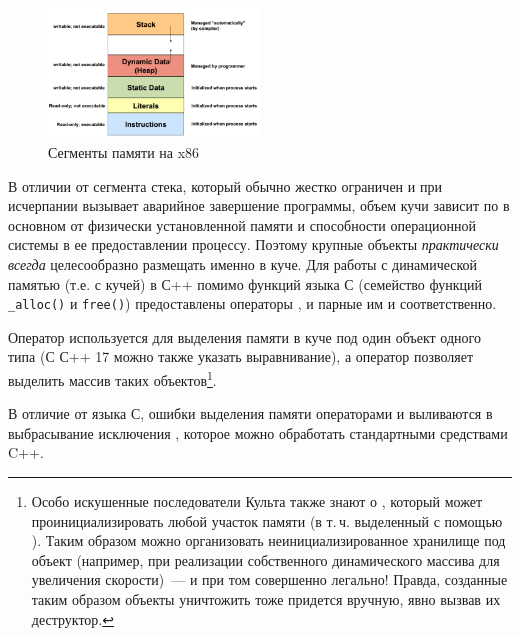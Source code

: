 \begin{figure}[h]
    \centering
    \includegraphics[width=0.5\textwidth]{resources/8-14/mem.png}
    \caption{Сегменты памяти на x86}
    \label{fig:memory_segments}
\end{figure}

В отличии от сегмента стека, который обычно жестко ограничен и при исчерпании вызывает аварийное завершение программы, объем кучи зависит по в основном
от физически установленной памяти и способности операционной системы в ее предоставлении процессу. Поэтому крупные объекты \textit{практически всегда}
целесообразно размещать именно в куче. Для работы с динамической памятью (т.е. с кучей) в С++ помимо функций языка С
(семейство функций \verb|_alloc()| и \verb|free()|) предоставлены операторы ,  и парные им  и 
соответственно.

Оператор  используется для выделения памяти в куче под один объект одного типа (С С++ 17 можно также указать выравнивание), а оператор
 позволяет выделить массив таких объектов\footnote{Особо искушенные последователи Культа
также знают о , который может проинициализировать любой участок памяти (в
т.\,ч. выделенный с помощью ). Таким образом можно организовать неинициализированное хранилище под объект (например, при реализации
собственного динамического массива для увеличения скорости)~--- и при том
совершенно легально! Правда, созданные таким образом объекты уничтожить тоже придется вручную, явно вызвав их деструктор.}.

В отличие от языка С, ошибки выделения памяти операторами  и  выливаются в выбрасывание исключения ,
которое можно обработать стандартными средствами C++.

